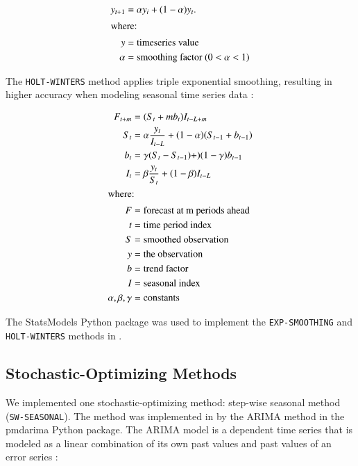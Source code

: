 \begin{align}
    \label{eq:expsm}
    y_{t+1} &= \alpha y_i + (1-\alpha)y_t. \\ 
    \intertext{where:}
    y &= \mbox{timeseries value} \nonumber \\
    \alpha &= \mbox{smoothing factor } (0 < \alpha < 1)
\end{align}

The \texttt{HOLT-WINTERS} method applies triple exponential 
smoothing, resulting in higher accuracy when 
modeling seasonal time series data 
\cite{sematech_engineering_2006}: 

\begin{align}
    F_{t+m} &= (S_t +mb_t)I_{t-L+m} \\
    S_t &= \alpha \frac{y_t}{I_{t-L}}+(1-\alpha)(S_{t-1}+b_{t-1}) \nonumber \\
    b_t &= \gamma(S_t-S_{t-1})+)(1-\gamma)b_{t-1} \nonumber \\
    I_t &= \beta \frac{y_t}{S_t} + (1-\beta)I_{t-L} \nonumber \\
    \intertext{where:}
    F &= \mbox{forecast at m periods ahead} \nonumber \\
    t &= \mbox{time period index} \nonumber \\
    S &= \mbox{smoothed observation} \nonumber \\
    y &= \mbox{the observation} \nonumber \\
    b &= \mbox{trend factor} \nonumber \\
    I &= \mbox{seasonal index} \nonumber \\
    \alpha, \beta, \gamma &= \mbox{constants} \nonumber
\end{align}

The StatsModels \cite{seabold_statsmodels:_2010}
Python package was used to implement the \texttt{EXP-SMOOTHING} 
and \texttt{HOLT-WINTERS} methods in \deploy. 

\subsection{Stochastic-Optimizing Methods}
We implemented one stochastic-optimizing method: step-wise 
seasonal method (\texttt{SW-SEASONAL}).
The method was implemented in \deploy by the \gls{ARIMA} 
method in the pmdarima \cite{smith_pmdarima:_2017}
Python package. 
The \gls{ARIMA} model is a dependent time series that is 
modeled as a linear combination of its own past values 
and past values of an error series \cite{institute_sas_1985}: 

